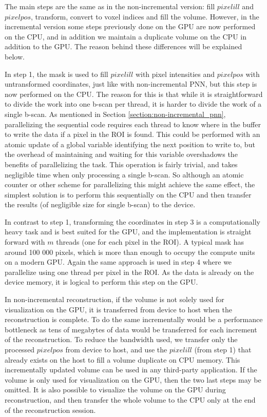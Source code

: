 The main steps are the same as in the non-incremental version: fill $pixelill$ and $pixelpos$, transform, convert to voxel indices and fill the volume. However, in the incremental version some steps previously done on the GPU are now performed on the CPU, and in addition we maintain a duplicate volume on the CPU in addition to the GPU. The reason behind these differences will be explained below.

In step 1, the mask is used to fill $pixelill$ with pixel intensities and $pixelpos$ with untransformed coordinates, just like with non-incremental PNN, but this step is now performed on the CPU. The reason for this is that while it is straightforward to divide the work into one b-scan per thread, it is harder to divide the work of a single b-scan. As mentioned in Section \ref{section:non-incremental_pnn}, parallelizing the sequential code requires each thread to know where in the buffer to write the data if a pixel in the ROI is found. This could be performed with an atomic update of a global variable identifying the next position to write to, but the overhead of maintaining and waiting for this variable overshadows the benefits of parallelizing the task. This operation is fairly trivial, and takes negligible time when only processing a single b-scan. So although an atomic counter or other scheme for parallelizing this might achieve the same effect, the simplest solution is to perform this sequentially on the CPU and then transfer the results (of negligible size for single b-scan) to the device.

In contrast to step 1, transforming the coordinates in step 3 is a computationally heavy task and is best suited for the GPU, and the implementation is straight forward with $m$ threads (one for each pixel in the ROI). A typical mask has around 100 000 pixels, which is more than enough to occupy the compute units on a modern GPU. Again the same approach is used in step 4 where we parallelize using one thread per pixel in the ROI. As the data is already on the device memory, it is logical to perform this step on the GPU.

In non-incremental reconstruction, if the volume is not solely used for visualization on the GPU, it is transferred from device to host when the reconstruction is complete. To do the same incrementally would be a performance bottleneck as tens of megabytes of data would be transferred for each increment of the reconstruction. To reduce the bandwidth used, we transfer only the processed $pixelpos$ from device to host, and use the $pixelill$ (from step 1) that already exists on the host to fill a volume duplicate on CPU memory. This incrementally updated volume can be used in any third-party application. If the volume is only used for visualization on the GPU, then the two last steps may be omitted. It is also possible to visualize the volume on the GPU during reconstruction, and then transfer the whole volume to the CPU only at the end of the reconstruction session.

